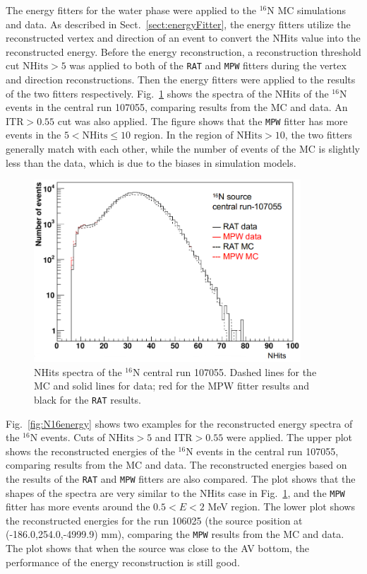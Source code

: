 The energy fitters for the water phase were applied to the $^{16}$N MC simulations and data. As described in Sect.~\ref{sect:energyFitter}, the energy fitters utilize the reconstructed vertex and direction of an event to convert the NHits value into the reconstructed energy. Before the energy reconstruction, a reconstruction threshold cut $\mathrm{NHits}>5$ was applied to both of the \texttt{RAT} and \texttt{MPW} fitters during the vertex and direction reconstructions. Then the energy fitters were applied to the results of the two fitters respectively. Fig.~\ref{fig:N16nhits} shows the spectra of the NHits of the $^{16}$N events in the central run 107055, comparing results from the MC and data. An $\mathrm{ITR}>0.55$ cut was also applied. The figure shows that the \texttt{MPW} fitter has more events in the $5<\mathrm{NHits}\leq 10$ region. In the region of $\mathrm{NHits}>10$, the two fitters generally match with each other, while the number of events of the MC is slightly less than the data, which is due to the biases in simulation models. 

\begin{figure}[htbp]
	\centering
	\includegraphics[width=10cm]{N16_nhits_107055.png}
	\caption[NHits spectra of the $^{16}$N central run 107055.]{NHits spectra of the $^{16}$N central run 107055. Dashed lines for the MC and solid lines for data; red for the MPW fitter results and black for the \texttt{RAT} results.\label{fig:N16nhits}}	
\end{figure}

Fig.~\ref{fig:N16energy} shows two examples for the reconstructed energy spectra of the $^{16}$N events. Cuts of $\mathrm{NHits}>5$ and $\mathrm{ITR}>0.55$ were applied. The upper plot shows the reconstructed energies of the $^{16}$N events in the central run 107055, comparing results from the MC and data. The reconstructed energies based on the results of the \texttt{RAT} and \texttt{MPW} fitters are also compared. The plot shows that the shapes of the spectra are very similar to the NHits case in Fig.~\ref{fig:N16nhits}, and the \texttt{MPW} fitter has more events around the $0.5<E<2$ MeV region. The lower plot shows the reconstructed energies for the run 106025 (the source position at (-186.0,254.0,-4999.9) mm), comparing the \texttt{MPW} results from the MC and data. The plot shows that when the source was close to the AV bottom, the performance of the energy reconstruction is still good.


